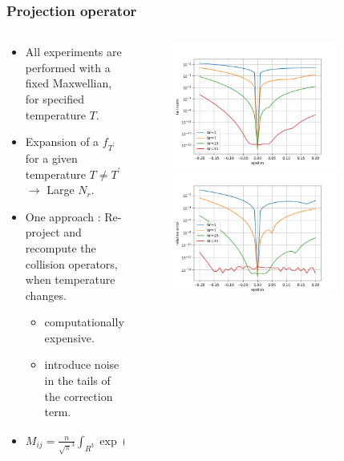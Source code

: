 \documentclass[mathserif, aspectratio=169]{beamer}
\begin{document}
	\begin{frame}
		\frametitle{Projection operator}
		\begin{columns}
			\begin{column}{0.45\textwidth}
				\begin{itemize}
					\item All experiments are performed with a fixed Maxwellian, for specified temperature $T$. 
					\item Expansion of a $f_{T^\prime}$ for a given temperature $T\neq T^{\prime}$ $\rightarrow$ Large $N_r$. 
					\item One approach : Re-project and recompute the collision operators, when temperature changes. 
					\begin{itemize}
						\item computationally expensive. 
						\item introduce noise in the tails of the correction term. 
					\end{itemize}
					\item $M_{ij} = \frac{n}{\sqrt{\pi}^{3}}  \int_{R^3}  \exp(-v_\alpha^2) P_i (v_\alpha (1 + \frac{\epsilon}{\beta})) P_j(v_\alpha) \frac{dv}{\alpha}$
				\end{itemize} 
			\end{column}	
			\begin{column}{0.6\textwidth}
				\begin{figure}
					\only<+>
					{
						\includegraphics[width=0.8\textwidth]{../fig/basis_1ev_tail.png}
					}
					\only<+>
					{
						\includegraphics[width=0.8\textwidth]{../fig/basis_1ev_grid.png}
					}
					

\end{figure}
\end{column}
\end{columns}
\end{frame}
\end{document}
